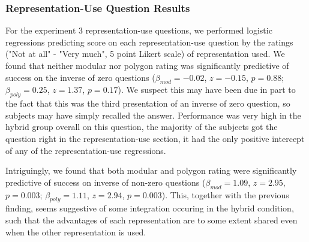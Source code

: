 \documentclass[man,10pt]{apa6}
\begin{document}
\subsubsection{Representation-Use Question Results}
For the experiment 3 representation-use questions, we performed logistic regressions predicting score on each representation-use question by the ratings ("Not at all" - "Very much", 5 point Likert scale) of representation used. We found that neither modular nor polygon rating was significantly predictive of success on the inverse of zero questions ($\beta_{mod} = -0.02$, $z = -0.15$, $p = 0.88$; $\beta_{poly} = 0.25$, $z = 1.37$, $p = 0.17$). We suspect this may have been due in part to the fact that this was the third presentation of an inverse of zero question, so subjects may have simply recalled the answer. Performance was very high in the hybrid group overall on this question, the majority of the subjects got the question right in the representation-use section, it had the only positive intercept of any of the representation-use regressions.\par 
Intriguingly, we found that both modular and polygon rating were significantly predictive of success on inverse of non-zero questions ($\beta_{mod} = 1.09$, $z = 2.95$, $p = 0.003$; $\beta_{poly} = 1.11$, $z = 2.94$, $p = 0.003$). This, together with the previous finding, seems suggestive of some integration occuring in the hybrid condition, such that the advantages of each representation are to some extent shared even when the other representation is used. 
\end{document}
